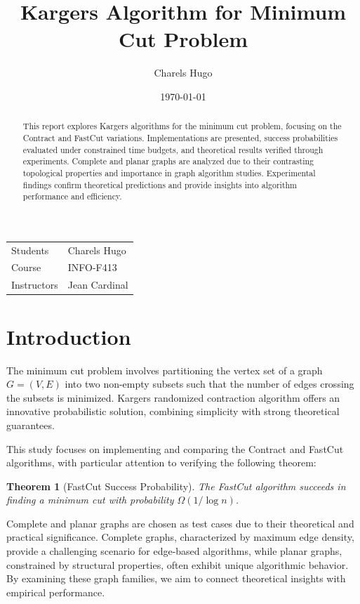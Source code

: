 \documentclass{article}
\title{Karger\textquotesingle{}s Algorithm for Minimum Cut Problem}
\author{Charels Hugo}
\date{\today}
\theoremstyle{plain} %
\newtheorem{theorem}{Theorem} %
\begin{document}
\maketitle

\noindent\begin{tabular}{@{}ll}
    Students     & Charels Hugo \\
    Course       & INFO-F413 \\
    Instructors  & Jean Cardinal \\
\end{tabular}


\begin{abstract}
This report explores Karger\textquotesingle{}s algorithms for the minimum cut problem, focusing on the Contract and FastCut variations. Implementations are presented, success probabilities evaluated under constrained time budgets, and theoretical results verified through experiments. Complete and planar graphs are analyzed due to their contrasting topological properties and importance in graph algorithm studies. Experimental findings confirm theoretical predictions and provide insights into algorithm performance and efficiency.
\end{abstract}


\section{Introduction}
The minimum cut problem involves partitioning the vertex set of a graph $G = (V, E)$ into two non-empty subsets such that the number of edges crossing the subsets is minimized. Karger\textquotesingle{}s randomized contraction algorithm offers an innovative probabilistic solution, combining simplicity with strong theoretical guarantees.

This study focuses on implementing and comparing the Contract and FastCut algorithms, with particular attention to verifying the following theorem:
\begin{theorem}[FastCut Success Probability]
The FastCut algorithm succeeds in finding a minimum cut with probability $\Omega(1/\log n)$.
\end{theorem}

Complete and planar graphs are chosen as test cases due to their theoretical and practical significance. Complete graphs, characterized by maximum edge density, provide a challenging scenario for edge-based algorithms, while planar graphs, constrained by structural properties, often exhibit unique algorithmic behavior. By examining these graph families, we aim to connect theoretical insights with empirical performance.
\end{document}
